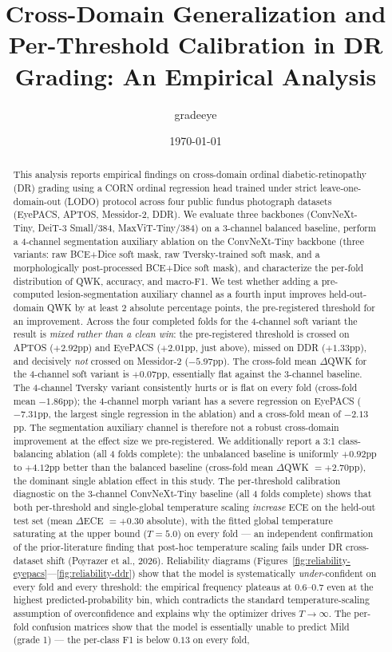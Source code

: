 \documentclass[11pt]{article}
\title{Cross-Domain Generalization and Per-Threshold Calibration in DR Grading: An Empirical Analysis}
\author{gradeeye}
\date{\today}
\begin{document}
\maketitle

\begin{abstract}
This analysis reports empirical findings on cross-domain ordinal diabetic-retinopathy (DR) grading using a CORN ordinal regression head trained under strict leave-one-domain-out (LODO) protocol across four public fundus photograph datasets (EyePACS, APTOS, Messidor-2, DDR). We evaluate three backbones (ConvNeXt-Tiny, DeiT-3 Small/384, MaxViT-Tiny/384) on a 3-channel balanced baseline, perform a 4-channel segmentation auxiliary ablation on the ConvNeXt-Tiny backbone (three variants: raw BCE+Dice soft mask, raw Tversky-trained soft mask, and a morphologically post-processed BCE+Dice soft mask), and characterize the per-fold distribution of QWK, accuracy, and macro-F1. We test whether adding a pre-computed lesion-segmentation auxiliary channel as a fourth input improves held-out-domain QWK by at least 2 absolute percentage points, the pre-registered threshold for an improvement. Across the four completed folds for the 4-channel soft variant the result is \emph{mixed rather than a clean win}: the pre-registered threshold is crossed on APTOS ($+2.92$pp) and EyePACS ($+2.01$pp, just above), missed on DDR ($+1.33$pp), and decisively \emph{not} crossed on Messidor-2 ($-5.97$pp). The cross-fold mean $\Delta$QWK for the 4-channel soft variant is $+0.07$pp, essentially flat against the 3-channel baseline. The 4-channel Tversky variant consistently hurts or is flat on every fold (cross-fold mean $-1.86$pp); the 4-channel morph variant has a severe regression on EyePACS ($-7.31$pp, the largest single regression in the ablation) and a cross-fold mean of $-2.13$pp. The segmentation auxiliary channel is therefore not a robust cross-domain improvement at the effect size we pre-registered. We additionally report a 3:1 class-balancing ablation (all 4 folds complete): the unbalanced baseline is uniformly $+0.92$pp to $+4.12$pp better than the balanced baseline (cross-fold mean $\Delta$QWK $= +2.70$pp), the dominant single ablation effect in this study. The per-threshold calibration diagnostic on the 3-channel ConvNeXt-Tiny baseline (all 4 folds complete) shows that both per-threshold and single-global temperature scaling \emph{increase} ECE on the held-out test set (mean $\Delta$ECE $= +0.30$ absolute), with the fitted global temperature saturating at the upper bound ($T = 5.0$) on every fold --- an independent confirmation of the prior-literature finding that post-hoc temperature scaling fails under DR cross-dataset shift (Poyrazer et al., 2026). Reliability diagrams (Figures~\ref{fig:reliability-eyepacs}---\ref{fig:reliability-ddr}) show that the model is systematically \emph{under}-confident on every fold and every threshold: the empirical frequency plateaus at $0.6$--$0.7$ even at the highest predicted-probability bin, which contradicts the standard temperature-scaling assumption of overconfidence and explains why the optimizer drives $T \to \infty$. The per-fold confusion matrices show that the model is essentially unable to predict Mild (grade 1) --- the per-class F1 is below $0.13$ on every fold, 
\end{abstract}
\end{document}
